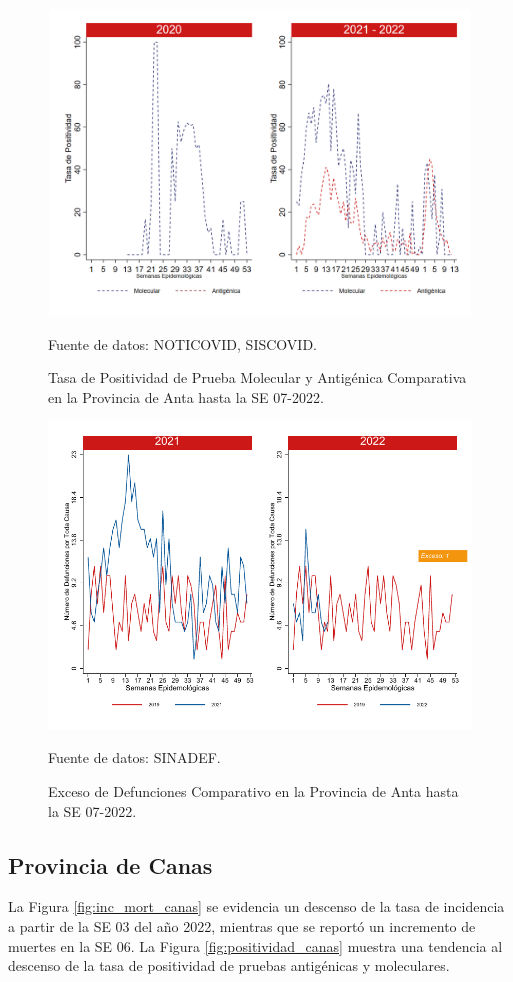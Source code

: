 \documentclass[12pt,a4paper,openany]{book}
\begin{document}
		\begin{figure}[h]
			\caption{Tasa de Positividad de Prueba Molecular y Antigénica Comparativa en la Provincia de Anta hasta la SE 07-2022.}\label{fig:positividad_anta}
			\begin{center}
				\includegraphics[width=0.7\linewidth]{../figuras/positividad_20_21_2.png}
			\end{center}
			{\footnotesize {Fuente de datos: NOTICOVID, SISCOVID.}}
		\end{figure}
		
		\begin{figure}[h]
			\caption{Exceso de Defunciones Comparativo en la Provincia de Anta hasta la SE 07-2022.}\label{fig:exceso_anta}
			\begin{center}
				\includegraphics[width=0.7\linewidth]{../figuras/exceso_2.pdf}
			\end{center}
			{\footnotesize {Fuente de datos: SINADEF.}}
		\end{figure}
		
		\clearpage
		
		\subsection*{Provincia de Canas}
		\noindent La Figura \ref{fig:inc_mort_canas} se evidencia un descenso de la tasa de incidencia a partir de la SE 03 del año 2022, mientras que se reportó un incremento de muertes en la SE 06. 
		\noindent La Figura \ref{fig:positividad_canas} muestra una tendencia al descenso de la tasa de positividad de pruebas antigénicas y moleculares. 
		
\end{document}
